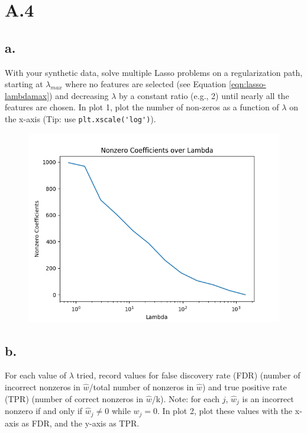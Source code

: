 \documentclass{article}
\newcommand{\1}{\mathbf{1}}
\begin{document}
\section*{A.4}
{\Large 



\subsection*{a.}

With your synthetic data, solve multiple Lasso problems on a regularization path, starting at $\lambda_{max}$ where no features are selected (see Equation \eqref{eqn:lasso-lambdamax}) and decreasing $\lambda$ by a constant ratio (e.g., 2) until nearly all the features are chosen. 
    In plot 1, plot the number of non-zeros as a function of $\lambda$ on the x-axis (Tip: use \verb|plt.xscale('log')|).

\begin{figure}[ht!]
  \centering
  \includegraphics[width=150mm]{../hw2-code/results/a4_a.png}
\end{figure}

\subsection*{b.}

For each value of $\lambda$ tried, record values for false discovery rate (FDR) (number of incorrect nonzeros in $\widehat{w}$/total number of nonzeros in $\widehat{w}$) and true positive rate (TPR)
    (number of correct nonzeros in $\widehat{w}$/k). Note: for each $j$, $\widehat{w}_j$ is an incorrect nonzero if and only if $\widehat{w}_j \neq 0$ while $w_j = 0$.
In plot 2, plot these values with the x-axis as FDR, and the y-axis as TPR.

}
\end{document}
